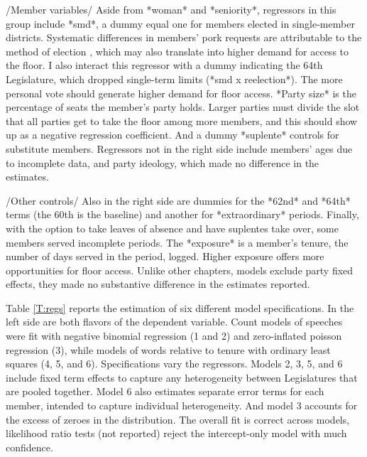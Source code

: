 \documentclass[letter,12pt]{article}
\begin{document}
/Member variables/ Aside from *woman* and *seniority*, regressors in this group include *smd*, a dummy equal one for members elected in single-member districts. Systematic differences in members' pork requests are attributable to the method of election \citep{kerevelPork2015}, which may also translate into higher demand for access to the floor. I also interact this regressor with a dummy indicating the 64th Legislature, which dropped single-term limits (*smd x reelection*). The more personal vote should generate higher demand for floor access. *Party size* is the percentage of seats the member's party holds. Larger parties must divide the slot that all parties get to take the floor among more members, and this should show up as a negative regression coefficient. And a dummy *suplente* controls for substitute members. Regressors not in the right side include members' ages due to incomplete data, and party ideology, which made no difference in the estimates.

/Other controls/ Also in the right side are dummies for the *62nd* and *64th* terms (the 60th is the baseline) and another for *extraordinary* periods. Finally, with the option to take leaves of absence and have suplentes take over, some members served incomplete periods. The *exposure* is a member's tenure, the number of days served in the period, logged. Higher exposure offers more opportunities for floor access. Unlike other chapters, models exclude party fixed effects, they made no substantive difference in the estimates reported.

Table \ref{T:regs} reports the estimation of six different model specifications. In the left side are both flavors of the dependent variable. Count models of speeches were fit with negative binomial regression (1 and 2) and zero-inflated poisson regression (3), while models of words relative to tenure with ordinary least squares (4, 5, and 6). Specifications vary the regressors. Models 2, 3, 5, and 6 include fixed term effects to capture any heterogeneity between Legislatures that are pooled together. Model 6 also estimates separate error terms for each member, intended to capture individual heterogeneity. And model 3 accounts for the excess of zeroes in the distribution. The overall fit is correct across models, likelihood ratio tests (not reported) reject the intercept-only model with much confidence.
\end{document}
